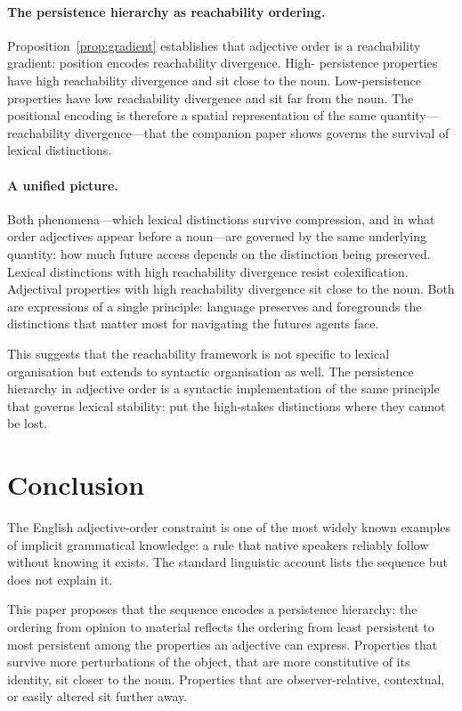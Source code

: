 \documentclass[11pt]{article}
\theoremstyle{rthm}
\theoremstyle{rdef}
\theoremstyle{remark}
\begin{document}
\paragraph{The persistence hierarchy as reachability ordering.}
Proposition~\ref{prop:gradient} establishes that adjective order is a
reachability gradient: position encodes reachability divergence. High-
persistence properties have high reachability divergence and sit close to
the noun. Low-persistence properties have low reachability divergence and
sit far from the noun. The positional encoding is therefore a spatial
representation of the same quantity---reachability divergence---that the
companion paper shows governs the survival of lexical distinctions.

\paragraph{A unified picture.}
Both phenomena---which lexical distinctions survive compression, and in what
order adjectives appear before a noun---are governed by the same underlying
quantity: how much future access depends on the distinction being preserved.
Lexical distinctions with high reachability divergence resist colexification.
Adjectival properties with high reachability divergence sit close to the noun.
Both are expressions of a single principle: language preserves and foregrounds
the distinctions that matter most for navigating the futures agents face.

This suggests that the reachability framework is not specific to lexical
organisation but extends to syntactic organisation as well. The persistence
hierarchy in adjective order is a syntactic implementation of the same
principle that governs lexical stability: put the high-stakes distinctions
where they cannot be lost.

\section{Conclusion}
\label{sec:conclusion}

The English adjective-order constraint is one of the most widely known
examples of implicit grammatical knowledge: a rule that native speakers
reliably follow without knowing it exists. The standard linguistic account
lists the sequence but does not explain it.

This paper proposes that the sequence encodes a persistence hierarchy: the
ordering from opinion to material reflects the ordering from least persistent
to most persistent among the properties an adjective can express. Properties
that survive more perturbations of the object, that are more constitutive of
its identity, sit closer to the noun. Properties that are observer-relative,
contextual, or easily altered sit further away.
\end{document}
